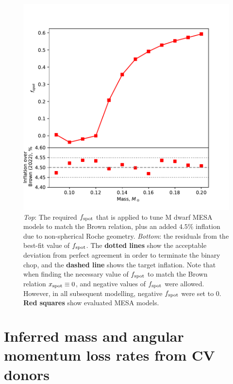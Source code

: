 \begin{figure}
    \centering
    \includegraphics[width=\textwidth]{figures/modelling/fspot_relation_to_match_brown_plus_4.5.pdf}
    \caption{{\it Top}: The required $f_{\rm spot}$ that is applied to tune M dwarf MESA models to match the Brown relation, plus an added $4.5\%$ inflation due to non-spherical Roche geometry. {\it Bottom}: the residuals from the best-fit value of $f_{\rm spot}$. The {\bf dotted lines} show the acceptable deviation from perfect agreement in order to terminate the binary chop, and the {\bf dashed line} shows the target inflation. Note that when finding the necessary value of $f_{\rm spot}$ to match the Brown relation $x_{\rm spot} \equiv 0$, and negative values of $f_{\rm spot}$ were allowed. However, in all subsequent modelling, negative $f_{\rm spot}$ were set to 0. {\bf Red squares} show evaluated MESA models.}
    \label{fig:modelling:fspot mass relationship}
\end{figure}



\section{Inferred mass and angular momentum loss rates from CV donors}
\label{sect:modelling:donor mass loss rates}

